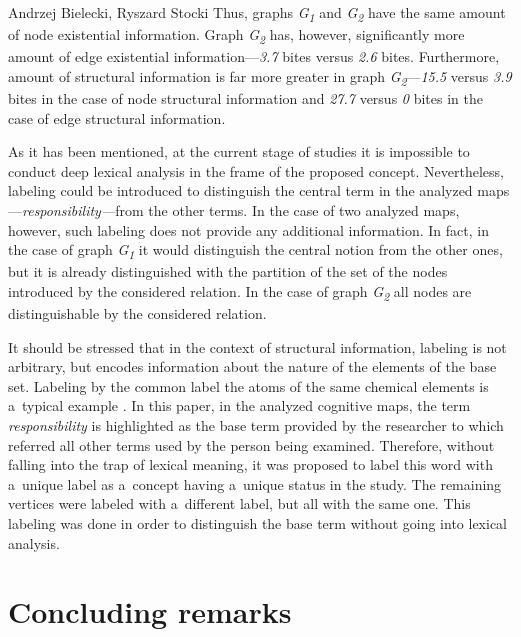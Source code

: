 \begin{artengenv2auth}{Andrzej Bielecki, Ryszard Stocki}
Thus, graphs \textit{G}\textit{\textsubscript{1}} and \textit{G}\textit{\textsubscript{2}} have the same amount of node existential information. Graph \textit{G}\textit{\textsubscript{2}} has, however, significantly more amount of edge existential information---\textit{3.7} bites versus \textit{2.6} bites. Furthermore, amount of structural information is far more greater in graph \textit{G}\textit{\textsubscript{2}}---\textit{15.5} versus \textit{3.9} bites in the case of node structural information and \textit{27.7} versus \textit{0} bites in the case of edge structural information.



As it has been mentioned, at the current stage of studies it is impossible to conduct deep lexical analysis in the frame of the proposed concept. Nevertheless, labeling could be introduced to distinguish the central term in the analyzed maps---\textit{responsibility---}from the other terms. In the case of two analyzed maps, however, such labeling does not provide any additional information. In fact, in the case of graph \textit{G}\textit{\textsubscript{1}} it would distinguish the central notion from the other ones, but it is already distinguished with the partition of the set of the nodes introduced by the considered relation. In the case of graph \textit{G}\textit{\textsubscript{2}} all nodes are distinguishable by the considered relation.



It should be stressed that in the context of structural information, labeling is not arbitrary, but encodes information about the nature of the elements of the base set. Labeling by the common label the atoms of the same chemical elements is a~typical example 
\parencite[see][]{bielecki_information_2022}. %
 In this paper, in the analyzed cognitive maps, the term \textit{responsibility} is highlighted as the base term provided by the researcher to which referred all other terms used by the person being examined. Therefore, without falling into the trap of lexical meaning, it was proposed to label this word with a~unique label as a~concept having a~unique status in the study. The remaining vertices were labeled with a~different label, but all with the same one. This labeling was done in order to distinguish the base term without going into lexical analysis.



\section{Concluding remarks}


\end{artengenv2auth}
